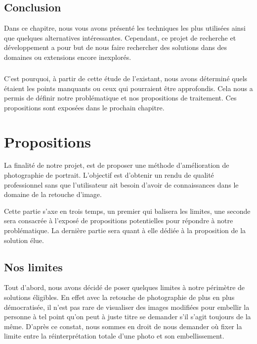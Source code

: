 \documentclass[11pt, french]{report-rd-info}
\begin{document}
\section{Conclusion}
Dans ce chapitre, nous vous avons présenté les techniques les plus utilisées ainsi que quelques alternatives intéressantes. Cependant, ce projet de recherche et développement a pour but de nous faire rechercher des solutions dans des domaines ou extensions encore inexplorés. 
\paragraph*{}
C’est pourquoi, à partir de cette étude de l’existant, nous avons déterminé quels étaient les points manquants ou ceux qui pourraient être approfondis. Cela nous a permis de définir notre problématique et nos propositions de traitement. Ces propositions sont exposées dans le prochain chapitre. 



\chapter{Propositions}
\label{chap:Propositions}
La finalité de notre projet, est de proposer une méthode d'amélioration de photographie de portrait. L’objectif est d’obtenir un rendu de qualité professionnel sans que l’utilisateur ait besoin d’avoir de connaissances dans le domaine de la retouche d’image.

Cette partie s’axe en trois temps, un premier qui balisera les limites, une seconde sera consacrée à l’exposé de propositions potentielles pour répondre à notre problématique. La dernière partie sera quant à elle dédiée à la proposition de la solution élue.

\section{Nos limites}
Tout d’abord, nous avons décidé de poser quelques limites à notre périmètre de solutions éligibles. En effet avec la retouche de photographie de plus en plus démocratisée, il n’est pas rare de visualiser des images modifiées pour embellir la personne à tel point qu’on peut à juste titre se demander s’il s’agit toujours de la même. D’après ce constat, nous sommes en droit de nous demander où fixer la limite entre la réinterprétation totale d’une photo et son embellissement.
\end{document}
